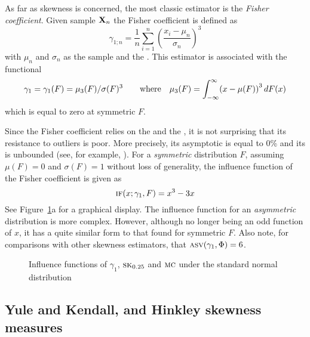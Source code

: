 As far as skewness is concerned, the most classic estimator is the \emph{Fisher
coefficient}. Given sample $\mathbf X_n$ the Fisher coefficient is defined as
\[
    \gamma_{1; n} = \frac{1}{n} \sum_{i=1}^n\left(\frac{x_i - \mu_n}{\sigma_n}\right)^{3}
\]
with $\mu_n$ and $\sigma_n$ as the sample  and the 
. This estimator is associated with the functional
\[
    \gamma_1 = \gamma_1(F) = \mu_{3}(F)/\sigma(F)^3
    \qquad\text{where}\quad
    \mu_{3}(F) = \int_{-\infty}^\infty \left(x-\mu(F)\right)^3 \dif F(x)
\]
which is equal to zero at symmetric $F$. 

Since the Fisher coefficient relies on the  and the , it is not surprising that its resistance to outliers is poor. More
precisely, its asymptotic  is equal to 0\% and its
 is unbounded (see, for example,
\citealp{groeneveld:1991}). For a \emph{symmetric} distribution $F$, assuming $\mu(F)
= 0$ and $\sigma(F) = 1$ without loss of generality, the influence function of  
the Fisher coefficient is given as
\[
    \stsc{IF}(x; \gamma_1, F) = x^{3} - 3x
\]
See Figure~\ref{fig:stat:IF_skew}a for a graphical display. The influence
function for an \emph{asymmetric} distribution is more complex. However,
although no longer being an odd function of $x$, it has a quite similar form to
that found for symmetric $F$. Also note, for comparisons with other skewness
estimators, that $\stsc{ASV}(\gamma_1, \Phi) = 6$.                            



\begin{figure}[h!]
    \centering
    \caption{Influence functions of $\gamma_1$, $\stsc{SK}_{0.25}$ and $\stsc{MC}$ under the standard normal distribution}
    \label{fig:stat:IF_skew}
\end{figure}

\subsection{Yule and Kendall, and Hinkley skewness measures}

